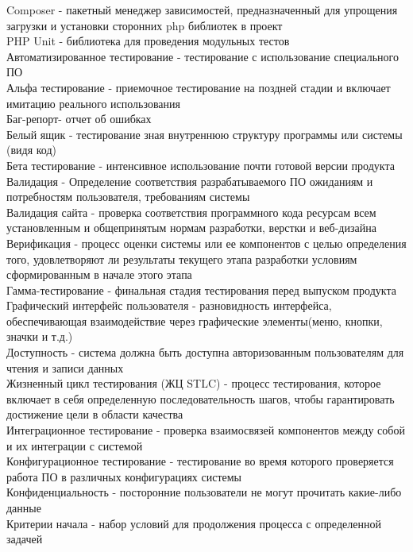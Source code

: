 \documentclass[11pt]{article}
\date{}
\title{}
\begin{document}
Composer - пакетный менеджер зависимостей, предназначенный для упрощения загрузки и установки сторонних php библиотек в проект \\
PHP Unit - библиотека для проведения модульных тестов \\
Автоматизированное тестирование - тестирование с использование специального ПО \\
Альфа тестирование - приемочное тестирование на поздней стадии и включает имитацию реального использования \\
Баг-репорт- отчет об ошибках \\
Белый ящик - тестирование зная внутреннюю структуру программы или системы  (видя код) \\
Бета тестирование - интенсивное использование почти готовой версии продукта \\
Валидация - Определение соответствия разрабатываемого ПО ожиданиям и потребностям пользователя, требованиям системы \\
Валидация сайта - проверка соответствия программного кода ресурсам всем установленным и общепринятым нормам разработки, верстки и веб-дизайна \\
Верификация - процесс оценки системы или ее компонентов с целью определения того, удовлетворяют ли результаты текущего этапа разработки условиям сформированным в начале этого этапа \\
Гамма-тестирование - финальная стадия тестирования перед выпуском продукта \\
Графический интерфейс пользователя - разновидность интерфейса, обеспечивающая взаимодействие через графические элементы(меню, кнопки, значки и т.д.) \\
Доступность - система должна быть доступна авторизованным пользователям для чтения и записи данных \\
Жизненный цикл тестирования (ЖЦ STLC) - процесс тестирования, которое включает в себя определенную последовательность шагов, чтобы гарантировать достижение цели в области качества \\
Интеграционное тестирование - проверка взаимосвязей компонентов между собой и их интеграции с системой \\
Конфигурационное тестирование - тестирование во время которого проверяется работа ПО в различных конфигурациях системы \\
Конфиденциальность - посторонние пользователи не могут прочитать какие-либо данные \\
Критерии начала - набор условий для продолжения процесса с определенной задачей \\
\end{document}
